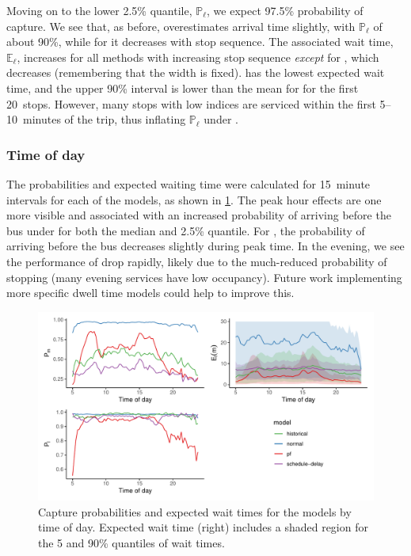 Moving on to the lower 2.5\% quantile, $\mathbb{P}_\ell$, we expect 97.5\% probability of capture. We see that, as before, \Fpf{} overestimates arrival time slightly, with $\mathbb{P}_\ell$ of about 90\%, while for \Fsched{} it decreases with stop sequence. The associated wait time, $\mathbb{E}_\ell$, increases for all methods with increasing stop sequence \emph{except} for \Fsched{}, which decreases (remembering that the width is fixed). \Fpf{} has the lowest expected wait time, and the upper 90\% interval is lower than the mean for \Fsched{} for the first 20~stops. However, many stops with low indices are serviced within the first 5--10~minutes of the trip, thus inflating $\mathbb{P}_\ell$ under \Fsched{}.


\subsubsection{Time of day}

The probabilities and expected waiting time were calculated for 15~minute intervals for each of the models, as shown in \cref{fig:model_results_pr_timeofday}. The peak hour effects are one more visible and associated with an increased probability of arriving before the bus under \Fpf{} for both the median and 2.5\% quantile. For \Fsched{}, the probability of arriving before the bus decreases slightly during peak time. In the evening, we see the performance of \Fpf{} drop rapidly, likely due to the much-reduced probability of stopping (many evening services have low occupancy). Future work implementing more specific dwell time models could help to improve this.


\begin{knitrout}\small
{}\color{fgcolor}\begin{figure}
\includegraphics[width=\textwidth]{figure/model_results_pr_timeofday-1} \caption[Capture probabilities and expected wait times for the models by time of day]{Capture probabilities and expected wait times for the models by time of day. Expected wait time (right) includes a shaded region for the 5 and 90\% quantiles of wait times.}\label{fig:model_results_pr_timeofday}
\end{figure}


\end{knitrout}



